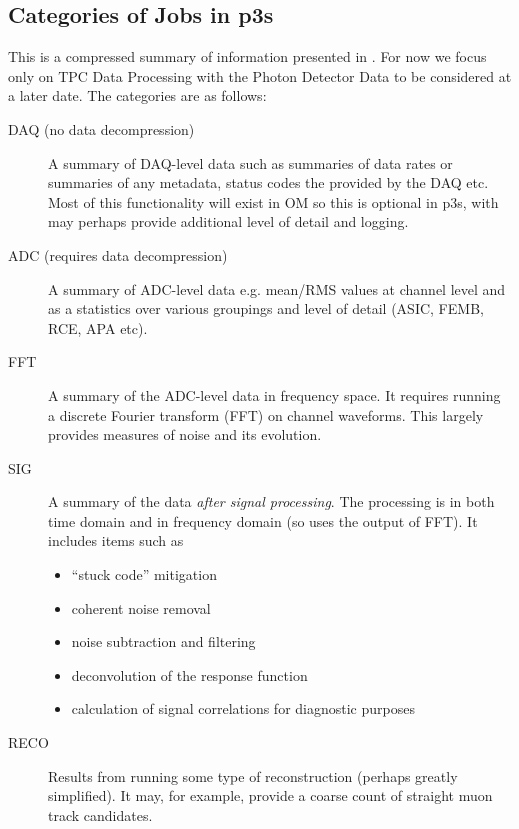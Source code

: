 \documentclass[pdftex,12pt,letter]{article}
\begin{document}
\subsection{Categories of Jobs in p3s}
\label{sec:scope}

\label{sec:categories}
This is a compressed summary of information presented in \cite{docdb1811}.
For now we focus only on TPC Data Processing with the Photon Detector Data
to be considered at a later date. The categories are as follows:

\begin{description}

\item[DAQ (no data decompression)] A summary of DAQ-level data  such as summaries of data
 rates  or summaries of any metadata, status codes the provided by the DAQ etc.
Most of this functionality will exist in OM so this is optional in p3s, with may perhaps
provide additional level of detail and logging.

\item[ADC (requires data decompression)] A summary of ADC-level data e.g. mean/RMS
values at channel level and as a statistics over various groupings and level of detail
(ASIC, FEMB, RCE, APA etc).


\item[FFT] A summary of the ADC-level data in frequency space. It requires running a discrete Fourier
transform (FFT) on channel waveforms. This largely  provides measures of noise and its
evolution.

\item[SIG] A summary of the data \textit{after signal processing}.
The processing is in  both time domain and in frequency domain (so uses the output of FFT).
It includes items such as
\begin{itemize}
\item ``stuck code'' mitigation
\item coherent noise removal
\item noise subtraction and filtering
\item deconvolution of the response function
\item calculation of signal correlations for diagnostic purposes
\end{itemize}

\item[RECO] Results from running some type of reconstruction (perhaps greatly simplified).
It may, for  example, provide a coarse count of straight muon track candidates.

\end{description}
\end{document}

